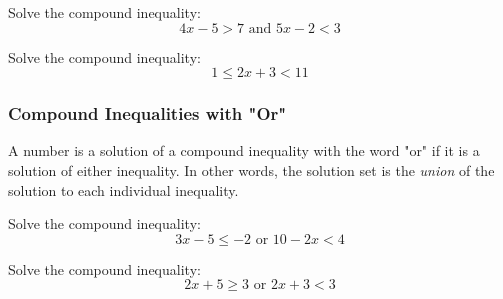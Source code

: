\begin{example}
Solve the compound inequality:
\[ 4x - 5 > 7 \text{ and } 5x-2 < 3\]
\vspace{3.5in}
\end{example}

\begin{example}
Solve the compound inequality:
\[ 1 \le 2x + 3 < 11\]
\end{example}

\newpage

\subsubsection*{Compound Inequalities with "Or"}

A number is a solution of a compound inequality with the word "or" if it is a solution of either inequality. In other words, the solution set is the \emph{union} of the solution to each individual inequality.
\vspace{.2in}

\begin{example}
Solve the compound inequality:
\[3x -5 \le -2 \text{ or } 10 - 2x < 4\]
\vspace{2in}
\end{example}

\begin{example}
Solve the compound inequality:
\[2x + 5 \ge 3 \text{ or } 2x + 3 < 3\]
\end{example}